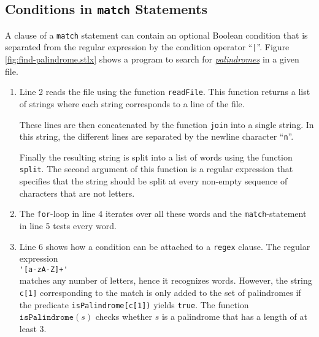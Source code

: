 \subsection{Conditions in \texttt{match} Statements}
A clause of a \texttt{match} statement can contain an optional Boolean condition that is
separated from the regular expression by the condition operator ``\texttt{|}''.   Figure
\ref{fig:find-palindrome.stlx} shows a program to search for 
\href{http://en.wikipedia.org/wiki/Palindrome}{\emph{palindromes}} 
in a given file.
\begin{enumerate}
\item Line 2 reads the file using the function \texttt{readFile}.  This function returns a list of
      strings where each string corresponds to a line of the file.  

      These lines are then concatenated by the function \texttt{join} into a single string.  In this
      string, the different lines are separated by the newline character ``\texttt{n}''.

      Finally the resulting string is split into a list of words using the function \texttt{split}.
      The second argument of this function is a regular expression that specifies that the string
      should be split at every non-empty sequence of characters that are not letters.
\item The \texttt{for}-loop in line 4 iterates over all these words and the \texttt{match}-statement
      in line 5 tests every word.
\item Line 6 shows how a condition can be attached to a \texttt{regex} clause. The regular
      expression 
      \\[0.2cm]
      \hspace*{1.3cm}
      \verb|'[a-zA-Z]+'|
      \\[0.2cm]
      matches any number of letters, hence it recognizes words.  However, the string \texttt{c[1]}
      corresponding to the match 
      is only added to the set of palindromes if the predicate \texttt{isPalindrome[c[1])} yields
      \texttt{true}.  The function $\texttt{isPalindrome}(s)$ checks whether $s$ is a palindrome that has
      a length of at least 3.
\end{enumerate}

